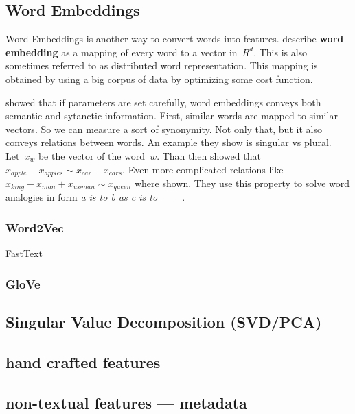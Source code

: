 \subsection{Word Embeddings}

Word Embeddings is another way to convert words into features.
\citet{LeGo14} describe {\bf word embedding} as a mapping of every word to a vector in~$R^d$.
This is also sometimes referred to as distributed word representation.
This mapping is obtained by using a big corpus of data by optimizing some cost function.

\citet{Mik13} showed that if parameters are set carefully, word embeddings conveys both semantic and sytanctic information.
First, similar words are mapped to similar vectors. So we can measure a sort of synonymity.
Not only that, but it also conveys relations between words.
An example they show is singular vs plural. Let~$x_{w}$ be the vector of the word~$w$.
Than then showed that $x_{apple}-x_{apples} \sim x_{car}-x_{cars}$.
Even more complicated relations like $x_{king} - x_{man} + x_{woman} \sim x_{queen}$ where shown.
They use this property to solve word analogies in form {\it a is to b as c is to \_\_\_}.

\subsubsection{Word2Vec}

FastText

\subsubsection{GloVe}


\subsection{Singular Value Decomposition (SVD/PCA)}

\subsection{hand crafted features}

\subsection{non-textual features --- metadata}


